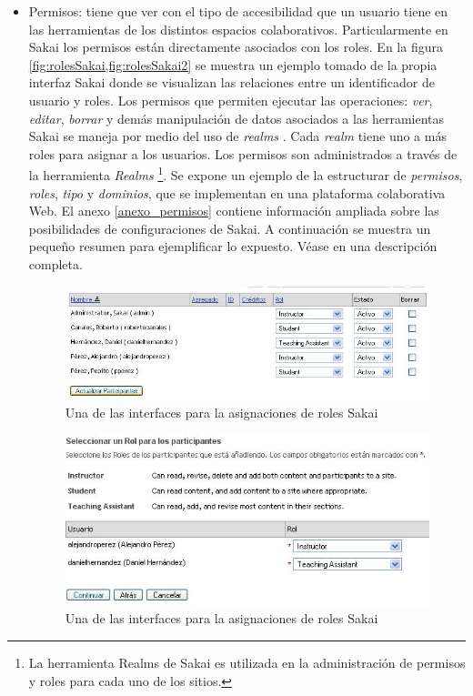 \begin{itemize}
\item Permisos: tiene que ver con el tipo de accesibilidad que un usuario tiene
en las herramientas de los distintos espacios colaborativos. Particularmente en
Sakai los permisos están directamente asociados con los roles. En la figura
\ref{fig:rolesSakai,fig:rolesSakai2} se muestra un ejemplo tomado de la propia
interfaz Sakai
donde se visualizan las relaciones entre un identificador de usuario y roles. 
Los permisos que permiten ejecutar las operaciones: \textit{ver},
\textit{editar}, \textit{borrar} y demás manipulación de datos asociados a las
herramientas Sakai se maneja por medio del uso de \textit{realms}
\cite{sakaimanual}. Cada \textit{realm} tiene uno a más roles para asignar a los
usuarios. Los permisos son administrados a
través de la herramienta \textit{Realms}
\footnote{La herramienta Realms de Sakai es utilizada en la administración de
permisos y roles para cada uno de los sitios.}. Se expone un ejemplo de la
estructurar de \textit{permisos}, \textit{roles}, \textit{tipo} y
\textit{dominios}, que se implementan en una
plataforma colaborativa Web. El anexo \ref{anexo_permisos} contiene
información ampliada sobre las posibilidades de configuraciones de Sakai. A
continuación se muestra un pequeño resumen para ejemplificar lo expuesto.
Véase en \cite{permisos_roles} una descripción completa. 


\begin{figure} 
\begin{center}
 \includegraphics [width=4 in,totalheight=2 in] {Ch1/Figuras/RolesSakai.jpg}
\caption {Una de las interfaces para la asignaciones de roles Sakai}
\label{fig:rolesSakai}
\end{center}
\end{figure}


\begin{figure} 
\begin{center}
 \includegraphics [width=4 in,totalheight=2 in] {Ch1/Figuras/RolesSakai2.jpg}
\caption {Una de las interfaces para la asignaciones de roles Sakai}
\label{fig:rolesSakai2}
\end{center}
\end{figure}




\end{itemize}
